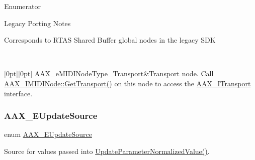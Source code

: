 \begin{DoxyEnumFields}{Enumerator}
\begin{DoxyRefDesc}{Legacy Porting Notes}
\item[\mbox{\hyperlink{a00787__porting_notes000029}{Legacy Porting Notes}}]Corresponds to R\+T\+AS Shared Buffer global nodes in the legacy S\+DK \end{DoxyRefDesc}
\\
\hline

[0pt][0pt]{}\mbox{\label{a00491_a5e1dffce35d05990dbbad651702678e4ac2ff856aec0724907dfd95b8e3ccbc20}} 
A\+A\+X\+\_\+e\+M\+I\+D\+I\+Node\+Type\+\_\+\+Transport&Transport node. Call \mbox{\hyperlink{a01845_a57bd132ee74047e25298b157c0bff2f9}{A\+A\+X\+\_\+\+I\+M\+I\+D\+I\+Node\+::\+Get\+Transport()}} on this node to access the \mbox{\hyperlink{a01885}{A\+A\+X\+\_\+\+I\+Transport}} interface. \\
\hline

\end{DoxyEnumFields}
\mbox{\label{a00491_a30be0398faf20c6b121239eb9399f3f7}} 
\subsubsection{\texorpdfstring{AAX\_EUpdateSource}{AAX\_EUpdateSource}}
{\footnotesize\ttfamily enum \mbox{\hyperlink{a00491_a30be0398faf20c6b121239eb9399f3f7}{A\+A\+X\+\_\+\+E\+Update\+Source}}}



Source for values passed into \mbox{\hyperlink{a01669_a685858711efb8634ce66c327f2865c71}{Update\+Parameter\+Normalized\+Value()}}. 

